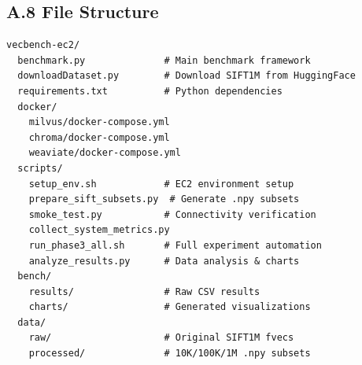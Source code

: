 \documentclass[12pt,a4paper]{article}
\begin{document}
\subsection*{A.8 File Structure}

\begin{verbatim}
vecbench-ec2/
  benchmark.py              # Main benchmark framework
  downloadDataset.py        # Download SIFT1M from HuggingFace
  requirements.txt          # Python dependencies
  docker/
    milvus/docker-compose.yml
    chroma/docker-compose.yml
    weaviate/docker-compose.yml
  scripts/
    setup_env.sh            # EC2 environment setup
    prepare_sift_subsets.py  # Generate .npy subsets
    smoke_test.py           # Connectivity verification
    collect_system_metrics.py
    run_phase3_all.sh       # Full experiment automation
    analyze_results.py      # Data analysis & charts
  bench/
    results/                # Raw CSV results
    charts/                 # Generated visualizations
  data/
    raw/                    # Original SIFT1M fvecs
    processed/              # 10K/100K/1M .npy subsets
\end{verbatim}
\end{document}
